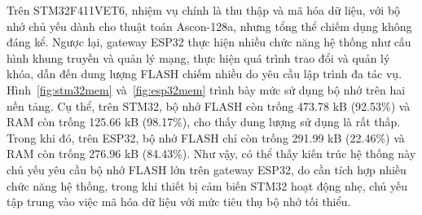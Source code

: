 Trên STM32F411VET6, nhiệm vụ chính là thu thập và mã hóa dữ liệu, với bộ nhớ chủ yếu dành cho thuật toán Ascon-128a, nhưng tổng thể chiếm dụng không đáng kể. Ngược lại, gateway ESP32 thực hiện nhiều chức năng hệ thống như cấu hình khung truyền và quản lý mạng, thực hiện quá trình trao đổi và quản lý khóa, dẫn đến dung lượng FLASH chiếm nhiều do yêu cầu lập trình đa tác vụ. Hình~\ref{fig:stm32mem} và~\ref{fig:esp32mem} trình bày mức sử dụng bộ nhớ trên hai nền tảng. Cụ thể, trên STM32, bộ nhớ FLASH còn trống 473.78 kB (92.53\%) và RAM còn trống 125.66 kB (98.17\%), cho thấy dung lượng sử dụng là rất thấp. Trong khi đó, trên ESP32, bộ nhớ FLASH chỉ còn trống 291.99 kB (22.46\%) và RAM còn trống 276.96 kB (84.43\%). Như vậy, có thể thấy kiến trúc hệ thống này chủ yếu yêu cầu bộ nhớ FLASH lớn trên gateway ESP32, do cần tích hợp nhiều chức năng hệ thống, trong khi thiết bị cảm biến STM32 hoạt động nhẹ, chủ yếu tập trung vào việc mã hóa dữ liệu với mức tiêu thụ bộ nhớ tối thiểu.

